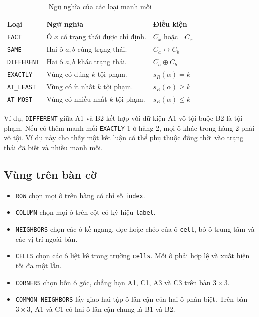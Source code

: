 \begin{table}[htbp]
\centering
\small
\begin{tabularx}{\linewidth}{lYl}
\toprule
Loại & Ngữ nghĩa & Điều kiện \\
\midrule
\texttt{FACT} & Ô $x$ có trạng thái được chỉ định. & $C_x$ hoặc $\neg C_x$ \\
\texttt{SAME} & Hai ô $a,b$ cùng trạng thái. & $C_a\leftrightarrow C_b$ \\
\texttt{DIFFERENT} & Hai ô $a,b$ khác trạng thái. & $C_a\oplus C_b$ \\
\texttt{EXACTLY} & Vùng có đúng $k$ tội phạm. & $s_R(\alpha)=k$ \\
\texttt{AT\_LEAST} & Vùng có ít nhất $k$ tội phạm. & $s_R(\alpha)\ge k$ \\
\texttt{AT\_MOST} & Vùng có nhiều nhất $k$ tội phạm. & $s_R(\alpha)\le k$ \\
\bottomrule
\end{tabularx}
\caption{Ngữ nghĩa của các loại manh mối}
\end{table}

Ví dụ, \texttt{DIFFERENT} giữa A1 và B2 kết hợp với dữ kiện A1 vô tội
buộc B2 là tội phạm. Nếu có thêm manh mối \texttt{EXACTLY} 1 ở hàng 2,
mọi ô khác trong hàng 2 phải vô tội. Ví dụ này cho thấy một kết luận
có thể phụ thuộc đồng thời vào trạng thái đã biết và nhiều manh mối.

\subsection{Vùng trên bàn cờ}

\begin{itemize}
    \item \texttt{ROW} chọn mọi ô trên hàng có chỉ số \texttt{index}.
    \item \texttt{COLUMN} chọn mọi ô trên cột có ký hiệu \texttt{label}.
    \item \texttt{NEIGHBORS} chọn các ô kề ngang, dọc hoặc chéo của ô
    \texttt{cell}, bỏ ô trung tâm và các vị trí ngoài bàn.
    \item \texttt{CELLS} chọn các ô liệt kê trong trường \texttt{cells}.
    Mỗi ô phải hợp lệ và xuất hiện tối đa một lần.
    \item \texttt{CORNERS} chọn bốn ô góc, chẳng hạn A1, C1, A3 và C3
    trên bàn $3\times3$.
    \item \texttt{COMMON\_NEIGHBORS} lấy giao hai tập ô lân cận của
    hai ô phân biệt. Trên bàn $3\times3$, A1 và C1 có hai ô lân cận
    chung là B1 và B2.
\end{itemize}

